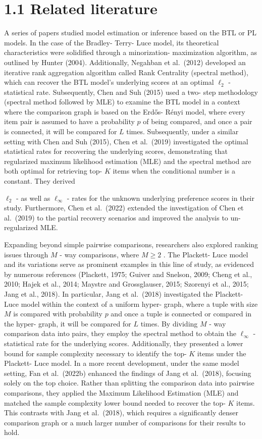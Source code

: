 \section{1.1 Related literature}\label{related-literature}

A series of papers studied model estimation or inference based on the
BTL or PL models. In the case of the Bradley- Terry- Luce model, its
theoretical characteristics were solidified through a minorization-
maximization algorithm, as outlined by Hunter (2004). Additionally,
Negahban et al.~(2012) developed an iterative rank aggregation algorithm
called Rank Centrality (spectral method), which can recover the BTL
model's underlying scores at an optimal \(\ell_2\) - statistical rate.
Subsequently, Chen and Suh (2015) used a two- step methodology (spectral
method followed by MLE) to examine the BTL model in a context where the
comparison graph is based on the Erdős- Rényi model, where every item
pair is assumed to have a probability \(p\) of being compared, and once
a pair is connected, it will be compared for \(L\) times. Subsequently,
under a similar setting with Chen and Suh (2015), Chen et al.~(2019)
investigated the optimal statistical rates for recovering the underlying
scores, demonstrating that regularized maximum likelihood estimation
(MLE) and the spectral method are both optimal for retrieving top- \(K\)
items when the conditional number is a constant. They derived

\(\ell_2\) - as well as \(\ell_\infty\) - rates for the unknown
underlying preference scores in their study. Furthermore, Chen et
al.~(2022) extended the investigation of Chen et al.~(2019) to the
partial recovery scenarios and improved the analysis to un- regularized
MLE.

Expanding beyond simple pairwise comparisons, researchers also explored
ranking issues through \(M\) - way comparisons, where \(M \geq 2\) . The
Plackett- Luce model and its variations serve as prominent examples in
this line of study, as evidenced by numerous references (Plackett, 1975;
Guiver and Snelson, 2009; Cheng et al., 2010; Hajek et al., 2014;
Maystre and Grossglauser, 2015; Szorenyi et al., 2015; Jang et al.,
2018). In particular, Jang et al.~(2018) investigated the Plackett- Luce
model within the context of a uniform hyper- graph, where a tuple with
size \(M\) is compared with probability \(p\) and once a tuple is
connected or compared in the hyper- graph, it will be compared for \(L\)
times. By dividing \(M\) - way comparison data into pairs, they employ
the spectral method to obtain the \(\ell_\infty\) - statistical rate for
the underlying scores. Additionally, they presented a lower bound for
sample complexity necessary to identify the top- \(K\) items under the
Plackett- Luce model. In a more recent development, under the same model
setting, Fan et al.~(2022b) enhanced the findings of Jang et al.~(2018),
focusing solely on the top choice. Rather than splitting the comparison
data into pairwise comparisons, they applied the Maximum Likelihood
Estimation (MLE) and matched the sample complexity lower bound needed to
recover the top- \(K\) items. This contrasts with Jang et al.~(2018),
which requires a significantly denser comparison graph or a much larger
number of comparisons for their results to hold.

